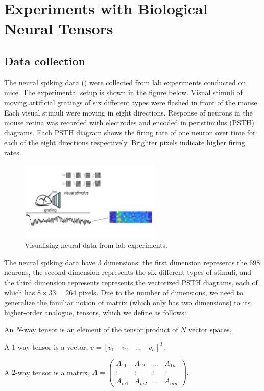 \chapter{Experiments with Biological Neural Tensors} 

\label{chapter-biological} 

\section{Data collection}

The neural spiking data (\cite{dyballa_manifold_2021}) were collected from lab experiments conducted on mice. The experimental setup is shown in the figure below. Visual stimuli of moving artificial gratings of six different types were flashed in front of the mouse. Each visual stimuli were moving in eight directions. Response of neurons in the mouse retina was recorded with electrodes and encoded in peristimulus (PSTH) diagrams. Each PSTH diagram shows the firing rate of one neuron over time for each of the eight directions respectively. Brighter pixels indicate higher firing rates.
\begin{figure}[H]
    \centering
        \includegraphics[width=0.6\textwidth]{presentation/Slide5.jpg}
        \caption{Visualising neural data from lab experiments.}
\end{figure}

\par The neural spiking data have $3$ dimensions: the first dimension represents the $698$ neurons, the second dimension represents the six different types of stimuli, and the third dimension represents represents the vectorized PSTH diagrams, each of which has $8\times 33 = 264$ pixels. Due to the number of dimensions, we need to generalize the familiar notion of matrix (which only has two dimensions) to its higher-order analogue, tensors, which we define as follows:

\begin{defn}[Tensors]
    An $N$-way tensor is an element of the tensor product of $N$ vector spaces. 
    
    A $1$-way tensor is a vector, $v = [v_1 \quad v_2 \quad \dots \quad v_n]^T.$ 
    
    A $2$-way tensor is a matrix, 
        $A = \left(\begin{matrix}
        A_{1 1} & A_{1 2} & \dots & A_{1 n}\\
        \vdots & \vdots & \vdots & \vdots \\ 
        A_{m 1} & A_{m 2} & \dots & A_{m n}
        \end{matrix}
        \right).$
    \end{defn}

